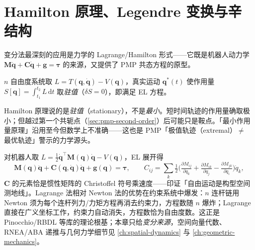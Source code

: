 \section{Hamilton 原理、Legendre 变换与辛结构}
\label{sec:pmp-hamilton}

变分法最深刻的应用是力学的 Lagrange/Hamilton 形式——它既是机器人动力学 $\mathbf M\ddot{\mathbf q}+\mathbf C\dot{\mathbf q}+\mathbf g=\boldsymbol\tau$ 的来源，又提供了 PMP 共态方程的原型。

\begin{theorem}[Hamilton 原理]\label{thm:pmp-hamilton}
$n$ 自由度系统取 $L=T(\mathbf q,\dot{\mathbf q})-V(\mathbf q)$，真实运动 $\mathbf q^\ast(t)$ 使作用量 $S[\mathbf q]=\int_{t_1}^{t_2}L\,\mathrm dt$ 取\emph{驻值}（$\delta S=0$），即满足 EL 方程。
\end{theorem}

\begin{pitfall}
Hamilton 原理说的是\emph{驻值}（stationary），不是\emph{最小}。短时间轨迹的作用量确取极小；但越过第一个共轭点（\cref{sec:pmp-second-order}）后可能只是鞍点。「最小作用量原理」沿用至今但数学上不准确——这也是 PMP「极值轨迹（extremal）$\ne$ 最优轨迹」警示的力学源头。
\end{pitfall}

对机器人取 $L=\tfrac12\dot{\mathbf q}^\top\mathbf M(\mathbf q)\dot{\mathbf q}-V(\mathbf q)$，EL 展开得
\begin{equation}
  \mathbf M(\mathbf q)\ddot{\mathbf q}+\mathbf C(\mathbf q,\dot{\mathbf q})\dot{\mathbf q}+\mathbf g(\mathbf q)=\boldsymbol\tau,\qquad
  C_{ij}=\sum_k\tfrac12\Big(\tfrac{\partial M_{ij}}{\partial q_k}+\tfrac{\partial M_{ik}}{\partial q_j}-\tfrac{\partial M_{jk}}{\partial q_i}\Big)\dot q_k,
  \label{eq:pmp-robot-dyn}
\end{equation}
$\mathbf C$ 的元素恰是惯性矩阵的 Christoffel 符号乘速度——印证「自由运动是构型空间测地线」。Lagrange 法相对 Newton 法的优势在约束系统中爆发：$n$ 连杆链用 Newton 须为每个连杆列力/力矩方程再消去约束力，方程数随 $n$ 爆炸；Lagrange 直接在广义坐标工作，约束力自动消失，方程数恰为自由度数。这正是 Pinocchio/RBDL 等库的理论根基；本章只给\emph{变分来源}，空间向量代数、RNEA/ABA 递推与几何力学细节见 \cref{ch:spatial-dynamics} 与 \cref{ch:geometric-mechanics}。

